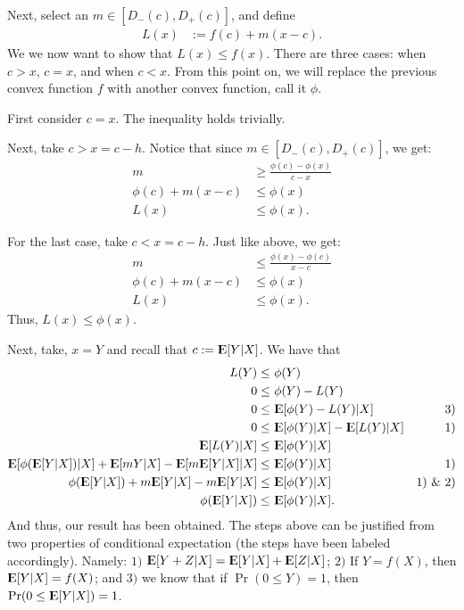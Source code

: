 \documentclass[12pt]{paper}
\newcommand{\Expect}{{\rm I\kern-.3em E}}
\begin{document}
Next, select an $m \in [D_-(c),D_+(c)]$, and define
\begin{align*}
L(x)&:=f(c)+m(x-c).
\end{align*}
We we now want to show that $L(x)\leq f(x)$. There are three cases: when $c>x$, $c=x$, and when $c<x$. From this point on, we will replace the previous convex function $f$ with another convex function, call it $\phi$.

First consider $c=x$. The inequality holds trivially.

Next, take $c>x=c-h$. Notice that since $m \in [D_-(c),D_+(c)]$, we get:
\begin{align*}
m&\geq \frac{\phi(c)-\phi(x)}{c-x}\\
\phi(c)+m(x-c)&\leq \phi(x)\\
L(x)&\leq \phi(x).
\end{align*}

For the last case, take $c<x=c-h$. Just like above, we get:
\begin{align*}
m&\leq \frac{\phi(x)-\phi(c)}{x-c}\\
\phi(c)+m(x-c)&\leq \phi(x)\\
L(x)&\leq \phi(x).
\end{align*}
Thus, $L(x)\leq\phi(x)$.

Next, take, $x=Y$ and recall that $c:=\Expect[Y|X]$. We have that
\begin{align*}
L(Y)\leq&~\phi(Y) &\\
0\leq&~\phi(Y)-L(Y) &\\
0\leq&~\Expect[\phi(Y)-L(Y)|X] & 3)\\
0\leq&~\Expect[\phi(Y)|X]-\Expect[L(Y)|X] &1)\\
\Expect[L(Y)|X]\leq&~\Expect[\phi(Y)|X]\\
\Expect[\phi(\Expect[Y|X])|X]+\Expect[mY|X]-\Expect[m\Expect[Y|X]|X]\leq&~\Expect[\phi(Y)|X] &1)\\
\phi(\Expect[Y|X])+m\Expect[Y|X]-m\Expect[Y|X]\leq&~\Expect[\phi(Y)|X] &1) \text{ \& } 2)\\
\phi(\Expect[Y|X])\leq&~\Expect[\phi(Y)|X].
\end{align*}
And thus, our result has been obtained. The steps above can be justified from two properties of conditional expectation (the steps have been labeled accordingly). Namely: $1)$ $\Expect[Y+Z|X]=\Expect[Y|X]+\Expect[Z|X]$; $2)$ If $Y=f(X)$, then $\Expect[Y|X]=f(X)$; and $3)$ we know that if $\Pr(0\leq Y)=1$, then $\Pr(0\leq \Expect[Y|X])=1$. 
\end{document}
